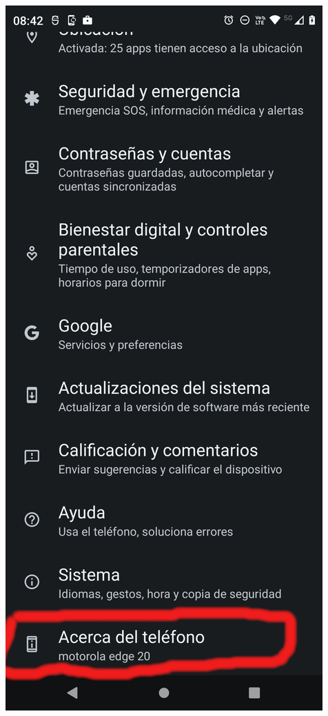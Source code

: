 \begin{frame}
\begin{columns}
\begin{center}
\end{center}
\begin{center}
\includegraphics[width=0.95\linewidth]{01_Configurar/ModoDesarrollador3.png}    

\end{center}
\end{columns}
\end{frame}
